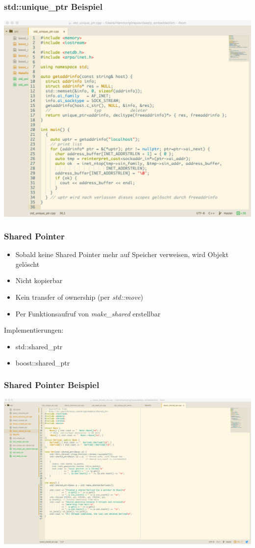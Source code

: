 \documentclass{beamer}
\begin{document}
\begin{frame}[fragile]
 \frametitle{std::unique\_ptr Beispiel}
 \includegraphics[scale=.265]{unique_ptr_usage}
\end{frame}

\begin{frame}
 \frametitle{Shared Pointer}
 \begin{itemize}
  \item Sobald keine Shared Pointer mehr auf Speicher verweisen, wird Objekt gelöscht
  \item Nicht kopierbar
  \item Kein transfer of ownership (per \textit{std::move})
  \item Per Funktionsaufruf von \textit{make\_shared} erstellbar
 \end{itemize}
 Implementierungen:
 \begin{itemize}
 	\item std::shared\_ptr
 	\item boost::shared\_ptr
 \end{itemize}
\end{frame}

\begin{frame}[fragile]
  \frametitle{Shared Pointer Beispiel}
  \includegraphics[scale=.2]{shared_ptr_usage}
\end{frame}
\end{document}
